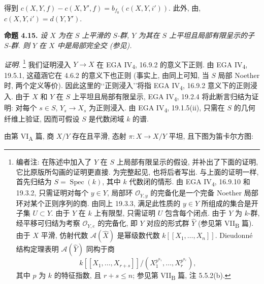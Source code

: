 得到 \(c(X,Y,f)-c(X,Y',f)=b_{f_0}(c(X,Y,i'))\).
此外, 由,
\(c(X,Y,i')=d(Y,Y')\).

\medskip
\noindent{}\textbf{命题 4.15.}
\textit{设 \(X\) 为在 \(S\) 上平滑的 \(S\)-群,
\(Y\) 为其在 \(S\) 上平坦且局部有限呈示的子 \(S\)-群.
则 \(Y\) 在 \(X\) 中是局部完全交 (参见).}

\noindent\textit{证明.}
\footnote{编者注: 在陈述中加入了 \(Y\) 在 \(S\) 上局部有限呈示的假设,
并补出了下面的证明, 它比原版所勾画的证明更直接.
为完整起见, 也将后者写出. 与上面的证明一样, 首先归结为
\(S=\operatorname{Spec}(k)\), 其中 \(k\) 代数闭的情形.
由 EGA IV\textsubscript{4}, 16.9.10 和 19.3.2,
只需证明对每个 \(y\in Y\), 局部环 \(\mathscr O_{Y,y}\) 的完备化是一个完备
Noether 局部环对某个正则序列的商. 由同上 19.3.3,
满足此性质的 \(y\in Y\) 所组成的集合是开子集 \(U\subset Y\).
由于 \(Y\) 在 \(k\) 上有限型, 只需证明 \(U\) 包含每个闭点.
由于 \(Y\) 为 \(k\)-群, 经平移可归结为考察
\(\mathscr O_{Y,e}\) 的完备化, 即 \(Y\) 对应的形式群 \(\widehat Y\)
(参见第 VII\textsubscript{B} 篇). 由于 \(X\) 平滑,
仿射代数 \(\mathscr A(\widehat X)\) 是幂级数代数 \(k[[X_1,\ldots,X_n]]\).
Dieudonn\'e 结构定理表明 \(\mathscr A(\widehat Y)\) 同构于商
\[
 k[[X_1,\ldots,X_{r+s}]]/
 (X_1^{p^{n_1}},\ldots,X_r^{p^{n_r}}),
\]
其中 \(p\) 为 \(k\) 的特征指数, 且 \(r+s\leq n\);
参见第 VII\textsubscript{B} 篇, 注 5.5.2(b).}
我们证明浸入 \(Y\to X\) 在 EGA IV\textsubscript{4}, 16.9.2 的意义下正则.
由 EGA IV\textsubscript{4}, 19.5.1, 这蕴涵它在 4.6.2 的意义下也正则
(事实上, 由同上可知, 当 \(S\) 局部 Noether 时, 两个定义等价).
因此这里的\lq\lq 正则浸入\rq\rq 将指 EGA IV\textsubscript{4}, 16.9.2 意义下的正则浸入.
由于 \(X\) 和 \(Y\) 在 \(S\) 上平坦且局部有限呈示,
EGA IV\textsubscript{4}, 19.2.4 将此断言归结为证明:
对每个 \(s\in S\), \(Y_s\to X_s\) 为正则浸入.
由 EGA IV\textsubscript{4}, 19.1.5(ii),
只需在 \(S\) 的几何纤维上验证, 因而可假设 \(S\) 是代数闭域 \(k\) 的谱.

由第 VI\textsubscript{A} 篇,
商 \(X/Y\) 存在且平滑, 态射 \(\pi:X\to X/Y\) 平坦, 且下图为笛卡尔方图:

\begin{center}
\end{center}

